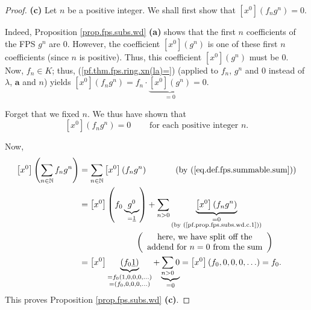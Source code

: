 \begin{proof}
\textbf{(c)} Let $n$ be a positive integer. We shall first show that $\left[
x^{0}\right]  \left(  f_{n}g^{n}\right)  =0$.

Indeed, Proposition \ref{prop.fps.subs.wd} \textbf{(a)} shows that the first
$n$ coefficients of the FPS $g^{n}$ are $0$. However, the coefficient $\left[
x^{0}\right]  \left(  g^{n}\right)  $ is one of these first $n$ coefficients
(since $n$ is positive). Thus, this coefficient $\left[  x^{0}\right]  \left(
g^{n}\right)  $ must be $0$. Now, $f_{n}\in K$; thus,
(\ref{pf.thm.fps.ring.xn(la)=}) (applied to $f_{n}$, $g^{n}$ and $0$ instead
of $\lambda$, $\mathbf{a}$ and $n$) yields $\left[  x^{0}\right]  \left(
f_{n}g^{n}\right)  =f_{n}\cdot\underbrace{\left[  x^{0}\right]  \left(
g^{n}\right)  }_{=0}=0$.

Forget that we fixed $n$. We thus have shown that
\begin{equation}
\left[  x^{0}\right]  \left(  f_{n}g^{n}\right)
=0\ \ \ \ \ \ \ \ \ \ \text{for each positive integer }n.
\label{pf.prop.fps.subs.wd.c.1}%
\end{equation}


Now,%
\begin{align*}
\left[  x^{0}\right]  \left(  \sum_{n\in\mathbb{N}}f_{n}g^{n}\right)   &
=\sum_{n\in\mathbb{N}}\left[  x^{0}\right]  \left(  f_{n}g^{n}\right)
\ \ \ \ \ \ \ \ \ \ \left(  \text{by (\ref{eq.def.fps.summable.sum})}\right)
\\
&  =\left[  x^{0}\right]  \left(  f_{0}\underbrace{g^{0}}_{=\underline{1}%
}\right)  +\sum_{n>0}\underbrace{\left[  x^{0}\right]  \left(  f_{n}%
g^{n}\right)  }_{\substack{=0\\\text{(by (\ref{pf.prop.fps.subs.wd.c.1}))}}}\\
&  \ \ \ \ \ \ \ \ \ \ \ \ \ \ \ \ \ \ \ \ \left(
\begin{array}
[c]{c}%
\text{here, we have split off the}\\
\text{addend for }n=0\text{ from the sum}%
\end{array}
\right) \\
&  =\left[  x^{0}\right]  \underbrace{\left(  f_{0}\underline{1}\right)
}_{\substack{=f_{0}\left(  1,0,0,0,\ldots\right)  \\=\left(  f_{0}%
,0,0,0,\ldots\right)  }}+\underbrace{\sum_{n>0}0}_{=0}=\left[  x^{0}\right]
\left(  f_{0},0,0,0,\ldots\right)  =f_{0}.
\end{align*}
This proves Proposition \ref{prop.fps.subs.wd} \textbf{(c)}.
\end{proof}

